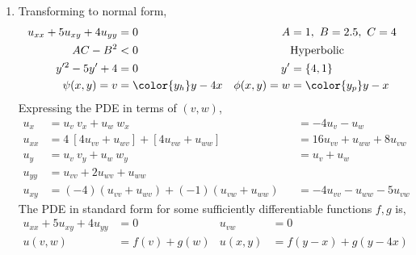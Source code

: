 \begin{enumerate}
    \item Transforming to normal form,
          \begin{align}
              u_{xx} + 5u_{xy} + 4u_{yy} & = 0                   &
              A                          & = 1,\ B = 2.5,\ C = 4   \\
              AC - B^2                   & < 0                   &
                                         & \text{Hyperbolic}       \\
              y'^2 - 5y' + 4             & = 0                   &
              y'                         & = \{4, 1\}              \\
              \psi(x, y) = v             & = \color{y_h} y - 4x  &
              \phi(x, y) = w             & = \color{y_p} y - x
          \end{align}
          Expressing the PDE in terms of $ (v, w) $,
          \begin{align}
              u_{x}  & = u_v\ v_x + u_w\ w_x                           &
                     & = -4u_v - u_w                                     \\
              u_{xx} & = 4\ [4u_{vv} + u_{wv}] + [4u_{vw} + u_{ww}]    &
                     & = 16u_{vv} + u_{ww} + 8u_{vw}                     \\
              u_{y}  & = u_v\ v_y + u_w\ w_y                           &
                     & = u_v + u_w                                       \\
              u_{yy} & = u_{vv} + 2u_{wv} + u_{ww}                       \\
              u_{xy} & = (-4)(u_{vv} + u_{wv}) + (-1)(u_{vw} + u_{ww}) &
                     & = -4 u_{vv} - u_{ww} - 5u_{vw}
          \end{align}
          The PDE in standard form for some sufficiently differentiable functions
          $ f, g $ is,
          \begin{align}
              u_{xx} + 5u_{xy} + 4u_{yy} & = 0                    &
              u_{vw}                     & = 0                      \\
              u(v, w)                    & = f(v) + g(w)          &
              u(x, y)                    & = f(y - x) + g(y - 4x)
          \end{align}


\end{enumerate}
